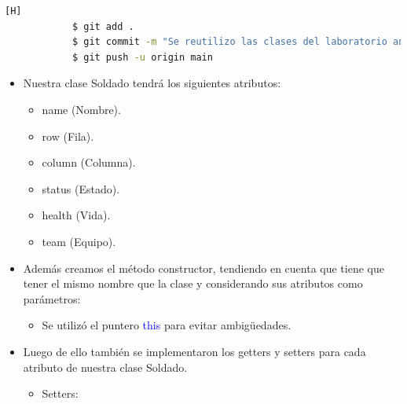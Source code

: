 \documentclass{article}
\begin{document}
        \begin{lstlisting}[language=bash,caption={Commit \href{https://github.com/hernanchoquehuanca/fp2-23b/commit/995eebff1a78185ffbdcbd551ebabeb7f6127f68}{995eebf}: En el primer commit se reutilizaba la clase Soldado.java del laboratorio anterior (lab07)}][H]
    		$ git add .
    		$ git commit -m "Se reutilizo las clases del laboratorio anterior, para en este caso realizarlo con hashmap"
    		$ git push -u origin main
    	\end{lstlisting}
        \newpage
        \begin{itemize}
            \item Nuestra clase Soldado tendrá los siguientes atributos:
            \begin{itemize}
                \item name (Nombre).
                \item row (Fila).
                \item column (Columna).
                \item status (Estado).
                \item health (Vida).
                \item team (Equipo).
            \end{itemize}
            
        \end{itemize}
        

        \begin{itemize}
            \item Además creamos el método constructor, tendiendo en cuenta que tiene que tener el mismo nombre que la clase y considerando sus atributos como parámetros:
            \begin{itemize}
                \item Se utilizó el puntero \textcolor{blue}{this} para evitar ambigüedades.
            \end{itemize}
        \end{itemize}

        

        \begin{itemize}
            \item Luego de ello también se implementaron los getters y setters para cada atributo de nuestra clase Soldado.
            \begin{itemize}
                \item Setters: 
            \end{itemize}
        \end{itemize}
\end{document}
